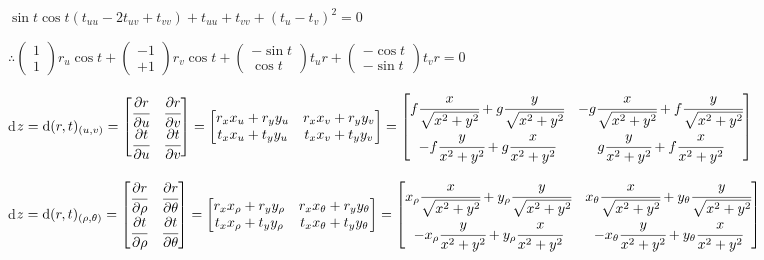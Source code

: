 \documentclass[10pt,a4paper]{article}
\begin{document}
		$\sin t \cos t (t_{uu} - 2t_{uv} + t_{vv}) + t_{uu} + t_{vv} + (t_u - t_v)^2 = 0$

		$\therefore \left( \begin{matrix} 1 \\ 1 \end{matrix} \right) r_u \cos t + \left( \begin{matrix} -1 \\ + 1 \end{matrix} \right) r_v \cos t + \left( \begin{matrix} - \sin t \\ \cos t \end{matrix} \right) t_u r + \left( \begin{matrix} - \cos t \\ - \sin t \end{matrix} \right) t_v r = 0$

		d$z = \mathrm{d}(r,t)_{(u,v)} = \left[ \begin{matrix} \cfrac{\partial r}{\partial u} & \cfrac{\partial r}{\partial v} \\ \cfrac{\partial t}{\partial u} & \cfrac{\partial t}{\partial v} \end{matrix} \right] = \left[ \begin{matrix} r_x x_u + r_y y_u & r_x x_v + r_y y_v \\ t_x x_u + t_y y_u & t_x x_v + t_y y_v  \end{matrix} \right] = \left[ \begin{matrix} f \cfrac{x}{\sqrt{x^2+y^2}} + g \cfrac{y}{\sqrt{x^2+y^2}} & - g \cfrac{x}{\sqrt{x^2+y^2}} + f \cfrac{y}{\sqrt{x^2+y^2}} \\ - f \cfrac{y}{x^2+y^2} + g \cfrac{x}{x^2+y^2} & g \cfrac{y}{x^2+y^2} + f \cfrac{x}{x^2+y^2}  \end{matrix} \right]$

		d$z = \mathrm{d}(r,t)_{(\rho,\theta)} = \left[ \begin{matrix} \cfrac{\partial r}{\partial \rho} & \cfrac{\partial r}{\partial \theta} \\ \cfrac{\partial t}{\partial \rho} & \cfrac{\partial t}{\partial \theta} \end{matrix} \right] = \left[ \begin{matrix} r_x x_\rho + r_y y_\rho & r_x x_\theta + r_y y_\theta \\ t_x x_\rho + t_y y_\rho & t_x x_\theta + t_y y_\theta \end{matrix} \right] = \left[ \begin{matrix} x_\rho\cfrac{x}{\sqrt{x^2+y^2}} + y_\rho\cfrac{y}{\sqrt{x^2+y^2}} & x_\theta\cfrac{x}{\sqrt{x^2+y^2}} + y_\theta\cfrac{y}{\sqrt{x^2+y^2}} \\ - x_\rho \cfrac{y}{x^2+y^2} + y_\rho\cfrac{x}{x^2+y^2} & - x_\theta\cfrac{y}{x^2+y^2} + y_\theta\cfrac{x}{x^2+y^2} \end{matrix} \right]$
\end{document}
